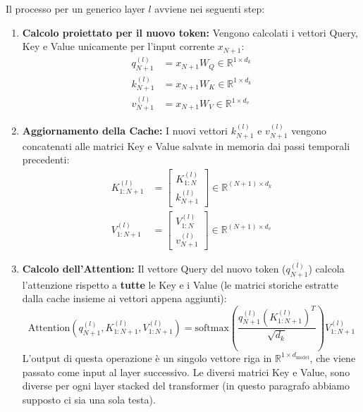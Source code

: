 Il processo per un generico layer $l$ avviene nei seguenti step:
\begin{enumerate}
    \item \textbf{Calcolo proiettato per il nuovo token:} Vengono calcolati i vettori Query, Key e Value unicamente per l'input corrente $x_{N+1}$:
    \begin{align}
        q_{N+1}^{(l)} &= x_{N+1} W_Q \in \mathbb{R}^{1 \times d_k} \\
        k_{N+1}^{(l)} &= x_{N+1} W_K \in \mathbb{R}^{1 \times d_k} \\
        v_{N+1}^{(l)} &= x_{N+1} W_V \in \mathbb{R}^{1 \times d_v}
    \end{align}
    \item \textbf{Aggiornamento della Cache:} I nuovi vettori $k_{N+1}^{(l)}$ e $v_{N+1}^{(l)}$ vengono concatenati alle matrici Key e Value salvate in memoria dai passi temporali precedenti:
    \begin{align}
        K_{1:N+1}^{(l)} &= \begin{bmatrix} K_{1:N}^{(l)} \\ k_{N+1}^{(l)} \end{bmatrix} \in \mathbb{R}^{(N+1) \times d_k} \\
        V_{1:N+1}^{(l)} &= \begin{bmatrix} V_{1:N}^{(l)} \\ v_{N+1}^{(l)} \end{bmatrix} \in \mathbb{R}^{(N+1) \times d_v}
    \end{align}
    \item \textbf{Calcolo dell'Attention:} Il vettore Query del nuovo token ($q_{N+1}^{(l)}$) calcola l'attenzione rispetto a \textbf{tutte} le Key e i Value (le matrici storiche estratte dalla cache insieme ai vettori appena aggiunti):
    \begin{equation}
        \text{Attention}\left(q_{N+1}^{(l)}, K_{1:N+1}^{(l)}, V_{1:N+1}^{(l)}\right) = \text{softmax}\left( \frac{q_{N+1}^{(l)} \left(K_{1:N+1}^{(l)}\right)^T}{\sqrt{d_k}} \right) V_{1:N+1}^{(l)}
    \end{equation}
    L'output di questa operazione è un singolo vettore riga in $\mathbb{R}^{1 \times d_{\text{model}}}$, che viene passato come input al layer successivo.
    Le diversi matrici Key e Value, sono diverse per ogni layer stacked del transformer (in questo paragrafo abbiamo supposto ci sia una sola testa).
\end{enumerate}




